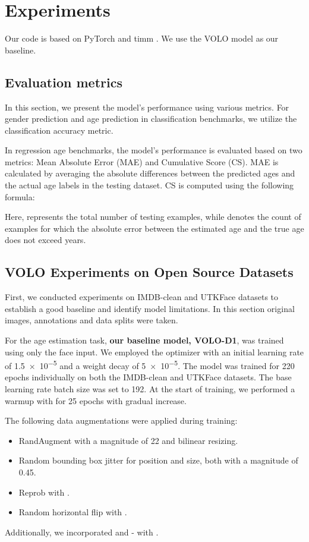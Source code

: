 \section{Experiments} \label{section:experiments}

Our code is based on PyTorch \cite{pytorch} and timm \cite{timm}. We use the VOLO \cite{volo} model as our baseline.

\subsection{Evaluation metrics} \label{section:metrics}

In this section, we present the model's performance using various metrics. For gender prediction and age prediction in classification benchmarks, we utilize the classification accuracy metric.

In regression age benchmarks, the model's performance is evaluated based on two metrics: Mean Absolute Error (MAE) and Cumulative Score (CS). MAE is calculated by averaging the absolute differences between the predicted ages and the actual age labels in the testing dataset. CS is computed using the following formula:



Here,  represents the total number of testing examples, while  denotes the count of examples for which the absolute error between the estimated age and the true age does not exceed  years.


\subsection{VOLO Experiments on Open Source Datasets}

First, we conducted experiments on IMDB-clean and UTKFace datasets to establish a good baseline and identify model limitations. In this section original images, annotations and data splits were taken.

For the age estimation task, \textbf{our baseline model, VOLO-D1}, was trained using only the face input. We employed the  optimizer with an initial learning rate of \num{1.5e-5} and a weight decay of \num{5e-5}. The model was trained for 220 epochs individually on both the IMDB-clean and UTKFace datasets. The base learning rate batch size was set to 192. At the start of training, we performed a warmup with  for 25 epochs with gradual increase.


The following data augmentations were applied during training:
\begin{itemize}
    \vspace{-0.2cm}\item RandAugment with a magnitude of 22 and bilinear resizing.
    \vspace{-0.2cm}\item Random bounding box jitter for position and size, both with a magnitude of 0.45.
    \vspace{-0.2cm}\item Reprob with .
    \vspace{-0.2cm}\item Random horizontal flip with .
\end{itemize}
Additionally, we incorporated  and - with .

